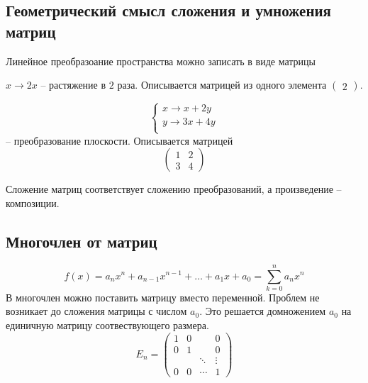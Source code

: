 \documentclass[12pt, a4paper]{article}
\begin{document}
    \subsection{Геометрический смысл сложения и умножения матриц}
    Линейное преобразоание пространства можно записать в виде матрицы
    \begin{exmp}
        \( x \to 2x \) -- растяжение в \( 2 \) раза. Описывается матрицей из одного элемента \( \begin{pmatrix} 2 \end{pmatrix}  \).
    \end{exmp}
    \begin{exmp}
        \[
            \begin{cases}
                x \to x + 2y \\
                y \to 3x + 4y \\
            \end{cases}
        \] -- преобразование плоскости. Описывается матрицей \[
        \begin{pmatrix} 1 & 2 \\ 3  &4 \end{pmatrix} 
        \]  
    \end{exmp}
    Сложение матриц соответствует сложению преобразований, а произведение -- композиции.
    \subsection{Многочлен от матриц}
    \[
        f(x) = a_{n}x^{n} + a_{n-1}x^{n-1} + \ldots + a_{1}x + a_{0} = \sum_{k=0}^{n} a_{n}x^{n}   
    \] 
    В многочлен можно поставить матрицу вместо переменной. Проблем не возникает до сложения матрицы с числом \( a_{0} \). Это решается домножением \( a_{0} \) на единичную матрицу соотвествующего размера. \[
        E_{n} = \begin{pmatrix} 1 & 0& & 0 \\ 0& 1 & &0 \\ &  & \ddots & \vdots \\ 0& 0& \cdots & 1 \end{pmatrix} 
    \] 
\end{document}
